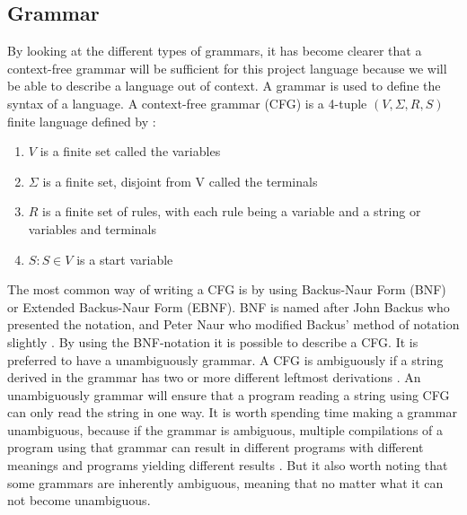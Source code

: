 \subsection{Grammar}
\label{sec:grammar}
By looking at the different types of grammars, it has become clearer that a context-free grammar will be sufficient for this project language because we will be able to describe a language out of context. A grammar is used to define the syntax of a language. A context-free grammar (CFG) is a 4-tuple $(V, \Sigma, R, S)$ finite language defined by \citep{sipser}:
\begin{enumerate}
	\item $V$ is a finite set called the variables
	\item $\Sigma$ is a finite set, disjoint from V called the terminals
	\item $R$ is a finite set of rules, with each rule being a variable and a string or variables and terminals
	\item $S: S \in V$ is a start variable
\end{enumerate}

The most common way of writing a CFG is by using Backus-Naur Form (BNF) or Extended Backus-Naur Form (EBNF). BNF is named after John Backus who presented the notation, and Peter Naur who modified Backus' method of notation slightly \citep{sebesta}. By using the BNF-notation it is possible to describe a CFG. It is preferred to have a unambiguously grammar. A CFG is ambiguously if a string derived in the grammar has two or more different leftmost derivations \citep{sipser}. An unambiguously grammar will ensure that a program reading a string using CFG can only read the string in one way.
It is worth spending time making a grammar unambiguous, because if the grammar is ambiguous, multiple compilations of a program using that grammar can result in different programs with different meanings and programs yielding different results \citep{sebesta}. But it also worth noting that some grammars are inherently ambiguous, meaning that no matter what it can not become unambiguous.



